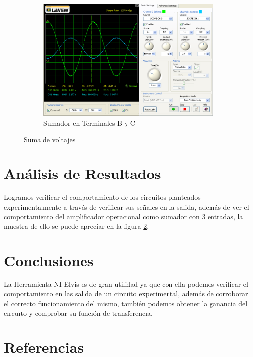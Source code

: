 \documentclass[]{article}
\begin{document}
\begin{figure}[h!]
\begin{subfigure}[b]{0.45\textwidth}
	\end{subfigure}
	~ 
	\begin{subfigure}[b]{0.45\textwidth}
		\includegraphics[width=\textwidth]{Imagenes/VBmasVC.png}
		\caption{Sumador en Terminales B y C}
		\label{fig:VBmasVC}
	\end{subfigure}
	\caption{Suma de voltajes}\label{fig:SumadorVoltajes}
	
\end{figure}


\section{Análisis de Resultados}

Logramos verificar el comportamiento de los circuitos planteados experimentalmente a través de verificar sus señales en la salida, además de ver el comportamiento del amplificador operacional como sumador con 3 entradas, la muestra de ello se puede apreciar en la figura \ref{fig:SumadorVoltajes}.\\

\section{Conclusiones}

La Herramienta NI Elvis es de gran utilidad ya que con ella podemos verificar el comportamiento en las salida de un circuito experimental, además de corroborar el correcto funcionamiento del mismo, también podemos obtener la ganancia del circuito y comprobar su función de transferencia.\\

\section{Referencias}



\end{document}
